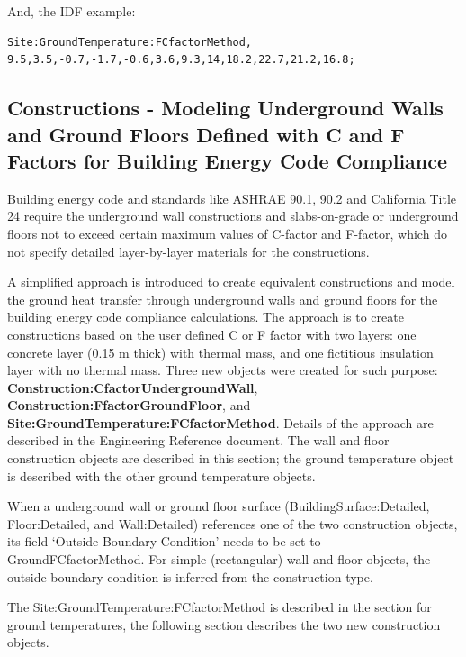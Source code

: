 And, the IDF example:

\begin{lstlisting}
Site:GroundTemperature:FCfactorMethod,  9.5,3.5,-0.7,-1.7,-0.6,3.6,9.3,14,18.2,22.7,21.2,16.8;
\end{lstlisting}

\subsection{Constructions - Modeling Underground Walls and Ground Floors Defined with C and F Factors for Building Energy Code Compliance}\label{constructions---modeling-underground-walls-and-ground-floors-defined-with-c-and-f-factors-for-building-energy-code-compliance}

Building energy code and standards like ASHRAE 90.1, 90.2 and California Title 24 require the underground wall constructions and slabs-on-grade or underground floors not to exceed certain maximum values of C-factor and F-factor, which do not specify detailed layer-by-layer materials for the constructions.

A simplified approach is introduced to create equivalent constructions and model the ground heat transfer through underground walls and ground floors for the building energy code compliance calculations. The approach is to create constructions based on the user defined C or F factor with two layers: one concrete layer (0.15 m thick) with thermal mass, and one fictitious insulation layer with no thermal mass. Three new objects were created for such purpose: \textbf{Construction:CfactorUndergroundWall}, \textbf{Construction:FfactorGroundFloor}, and \textbf{Site:GroundTemperature:FCfactorMethod}. Details of the approach are described in the Engineering Reference document. The wall and floor construction objects are described in this section; the ground temperature object is described with the other ground temperature objects.

When a underground wall or ground floor surface (BuildingSurface:Detailed, Floor:Detailed, and Wall:Detailed) references one of the two construction objects, its field `Outside Boundary Condition' needs to be set to GroundFCfactorMethod. For simple (rectangular) wall and floor objects, the outside boundary condition is inferred from the construction type.

The Site:GroundTemperature:FCfactorMethod is described in the section for ground temperatures, the following section describes the two new construction objects.

